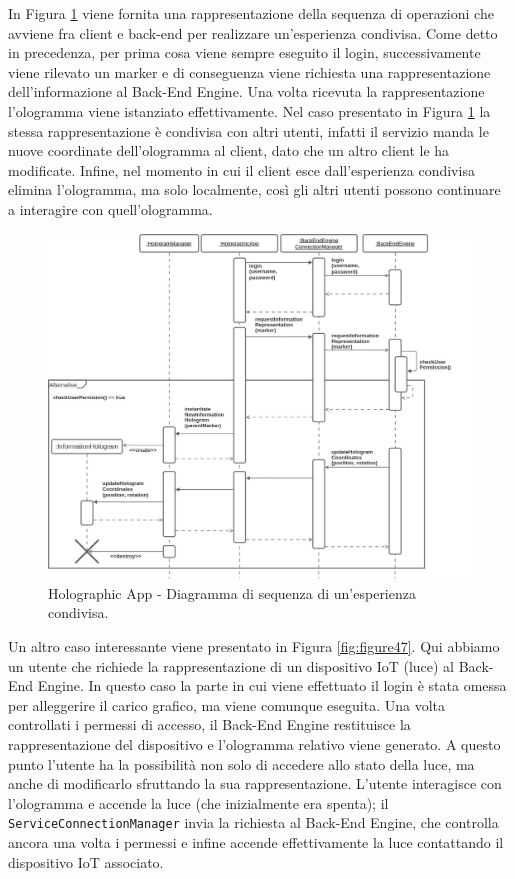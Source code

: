 In Figura \ref{fig:figure46} viene fornita una rappresentazione della sequenza di operazioni che avviene fra client e back-end per realizzare un'esperienza condivisa.
Come detto in precedenza, per prima cosa viene sempre eseguito il login, successivamente viene rilevato un marker e di conseguenza viene richiesta una rappresentazione dell'informazione al Back-End Engine.
Una volta ricevuta la rappresentazione l'ologramma viene istanziato effettivamente.
Nel caso presentato in Figura \ref{fig:figure46} la stessa rappresentazione è condivisa con altri utenti, infatti il servizio manda le nuove coordinate dell'ologramma al client, dato che un altro client le ha modificate.
Infine, nel momento in cui il client esce dall'esperienza condivisa elimina l'ologramma, ma solo localmente, così gli altri utenti possono continuare a interagire con quell'ologramma.

\begin{figure}[H]
    \centering
    \includegraphics[width=\textwidth]{images/MR Client - Diagramma di Sequenza Esperienza Condivisa.jpg}
    \caption{Holographic App - Diagramma di sequenza di un'esperienza condivisa.}
    \label{fig:figure46}
\end{figure}

Un altro caso interessante viene presentato in Figura \ref{fig:figure47}.
Qui abbiamo un utente che richiede la rappresentazione di un dispositivo IoT (luce) al Back-End Engine.
In questo caso la parte in cui viene effettuato il login è stata omessa per alleggerire il carico grafico, ma viene comunque eseguita.
Una volta controllati i permessi di accesso, il Back-End Engine restituisce la rappresentazione del dispositivo e l'ologramma relativo viene generato.
A questo punto l'utente ha la possibilità non solo di accedere allo stato della luce, ma anche di modificarlo sfruttando la sua rappresentazione.
L'utente interagisce con l'ologramma e accende la luce (che inizialmente era spenta); il \texttt{ServiceConnectionManager} invia la richiesta al Back-End Engine, che controlla ancora una volta i permessi e infine accende effettivamente la luce contattando il dispositivo IoT associato.

